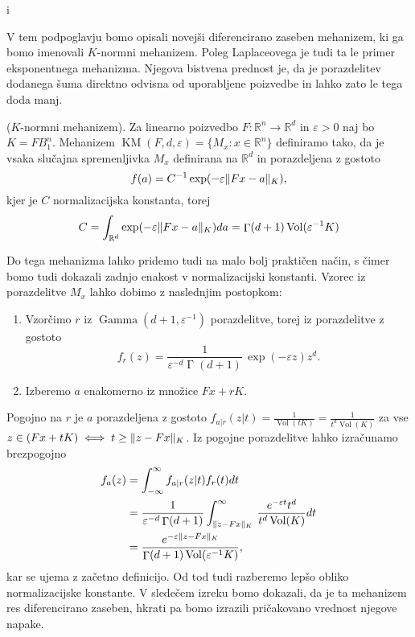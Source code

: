 i\documentclass[mat1]{fmfdelo}
\DeclarePairedDelimiter{\norm}{\lVert}{\rVert}
\newcommand{\R}{\mathbb R}
\DeclareMathOperator{\Vol}{Vol}
\DeclareMathOperator{\gfn}{\Gamma}
\DeclareMathOperator{\KM}{KM}
\newcommand{\query}{F: \R^n \to \R^d}
\begin{document}
V tem podpoglavju bomo opisali novejši diferencirano zaseben mehanizem, ki ga bomo imenovali $K$-normni mehanizem. Poleg Laplaceovega je tudi ta le primer eksponentnega mehanizma. Njegova bistvena prednost je, da je porazdelitev dodanega šuma direktno odvisna od uporabljene poizvedbe in lahko zato le tega doda manj.

\begin{definicija} \label{knorm}
    ($K$-normni mehanizem). Za linearno poizvedbo $\query$ in $\varepsilon > 0$ naj bo $K = FB_1^n$. Mehanizem $\KM(F, d, \varepsilon) = \{M_x: x\in \R^n\}$ definiramo tako, da je vsaka slučajna spremenljivka $M_x$ definirana na $\R^d$ in porazdeljena z gostoto
    \begin{equation*}
        f(a) = C^{-1} \exp(-\varepsilon \norm{Fx-a}_K),
    \end{equation*}
    kjer je $C$ normalizacijska konstanta, torej
    \begin{equation*}
        C = \int_{\R^d} \exp(-\varepsilon \norm{Fx-a}_K) da = \gfn(d+1) \Vol(\varepsilon^{-1} K)
    \end{equation*}
\end{definicija}

Do tega mehanizma lahko pridemo tudi na malo bolj praktičen način, s čimer bomo tudi dokazali zadnjo enakost v normalizacijski konstanti. Vzorec iz porazdelitve $M_x$ lahko dobimo z naslednjim postopkom:
\begin{enumerate}
    \item Vzorčimo $r$ iz $\operatorname{Gamma}(d+1, \varepsilon^{-1})$ porazdelitve, torej iz porazdelitve z gostoto
    \begin{equation*}
        f_r(z) = \frac{1}{\varepsilon^{-d}  \gfn(d+1)} \, \exp(-\varepsilon z) z^d.
    \end{equation*}
    \item Izberemo $a$ enakomerno iz množice $Fx + rK$.
\end{enumerate}
Pogojno na $r$ je $a$ porazdeljena z gostoto $f_{a|r}(z | t)=\frac{1}{\Vol(tK)}=\frac{1}{t^d \Vol(K)}$ za vse $z \in (Fx + tK) \iff t \geq \norm{z-Fx}_K$. Iz pogojne porazdelitve lahko izračunamo brezpogojno
\begin{equation*}
    \begin{aligned}
    f_a(z) &= \int_{-\infty}^{\infty} f_{a|r}(z|t) f_r(t) dt \\
    &=  \frac{1}{\varepsilon^{-d} \gfn(d+1)} \int_{\norm{z-Fx}_K}^{\infty}  \, \frac{e^{-\varepsilon t} t^d}{t^{d} \Vol(K)} dt \\
    &= \frac{e^{-\varepsilon \norm{z-Fx}_K}}{\gfn(d+1) \Vol(\varepsilon^{-1}K)},
    \end{aligned}
\end{equation*}
kar se ujema z začetno definicijo. Od tod tudi razberemo lepšo obliko normalizacijske konstante. V sledečem izreku bomo dokazali, da je ta mehanizem res diferencirano zaseben, hkrati pa bomo izrazili pričakovano vrednost njegove napake.
\end{document}

